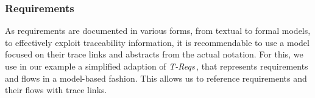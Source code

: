 
\subsubsection{Requirements}



As requirements are documented in various forms, from textual to formal models, to effectively exploit traceability information, it is recommendable to use a model focused on their trace links %
and abstracts
from the actual notation.
For this, we use in our example a simplified adaption of \emph{T-Reqs}\,\cite{Grosser2022RDR}, that represents requirements and flows in a model-based fashion.
This allows us to reference requirements and their flows with trace links.

